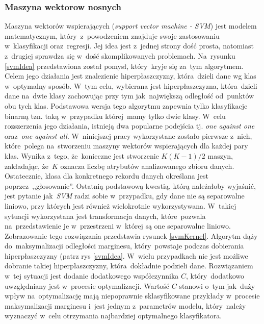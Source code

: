 \subsubsection{Maszyna wektorow nosnych}
Maszyna wektorów wspierających (\textit{support vector machine - SVM}) jest modelem matematycznym, który~z~powodzeniem znajduje swoje zastosowaniu w~klasyfikacji oraz~regresji. Jej idea jest z~jednej strony dość prosta, natomiast z~drugiej sprawdza się w~dość skomplikowanych problemach\cite{svm1}. Na~rysunku \ref{svmIdea} przedstawiona został pomysł, który~kryje się za~tym algorytmem. Celem jego działania jest znalezienie hiperpłaszczyzny, która~dzieli dane wg klas w~optymalny sposób. W~tym celu, wybierana jest hiperpłaszczyzna, która~dzieli dane na~dwie klasy zachowując przy tym jak~największą odległość od~punktów obu tych klas\cite{svm2}. Podstawowa wersja tego algorytmu zapewnia tylko klasyfikacje binarną tzn. taką w~przypadku której~mamy tylko dwie klasy. W~celu rozszerzenia jego działania, istnieją dwa popularne podejścia  tj. \textit{one against one} oraz~\textit{one against all}\cite{svm3}. W~niniejszej pracy wykorzystane zostało pierwsze z~nich, które~polega na~stworzeniu maszyny wektorów wspierających dla każdej pary klas. Wynika z~tego, że~konieczne jest stworzenie $K(K-1)/2$ maszyn, zakładając, że~$K$ oznacza liczbę atrybutów analizowanego zbioru danych. Ostatecznie, klasa dla konkretnego rekordu danych określana jest poprzez~,,głosowanie''. Ostatnią podstawową kwestią, którą należałoby wyjaśnić, jest pytanie jak~\textit{SVM} radzi sobie w~przypadku, gdy dane nie są separowalne liniowo, przy których jest również wielokrotnie wykorzystywana. W~takiej sytuacji wykorzystana jest transformacja danych, które~pozwala na~przedstawienie je w~przestrzeni w~której są one separowalne liniowo. Zobrazowanie tego rozwiązania przedstawia rysunek \ref{svmKernel}. Algorytm dąży do~maksymalizacji odległości marginesu, który~powstaje podczas dobierania hiperpłaszczyzny (patrz rys \ref{svmIdea}. W~wielu przypadkach nie jest możliwe dobranie takiej hiperpłaszczyzny, która~dokładnie podzieli dane. Rozwiązaniem w~tej sytuacji jest dodanie dodatkowego współczynnika $C$, który~dodatkowo uwzględniany jest w~procesie optymalizacji. Wartość $C$ stanowi o~tym jak~duży wpływ na~optymalizację mają niepoprawnie sklasyfikowane przykłady w~procesie maksymalizacji marginesu i~jest jednym z~parametrów modelu, który~należy wyznaczyć w~celu otrzymania najbardziej optymalnego klasyfikatora.


